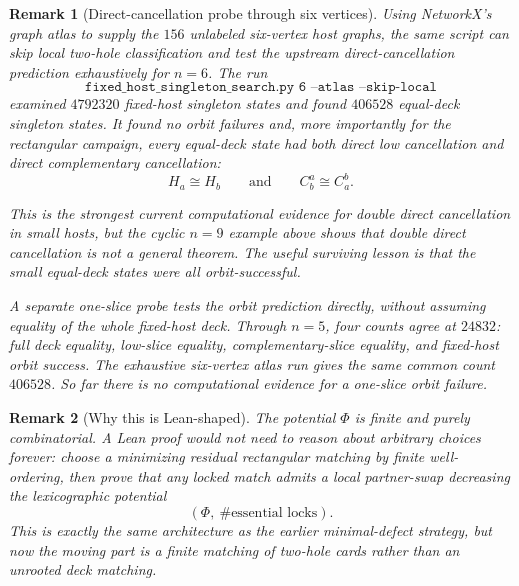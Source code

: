 \documentclass[11pt]{article}
\newtheorem{remark}{Remark}
\begin{document}
\begin{remark}[Direct-cancellation probe through six vertices]
Using NetworkX's graph atlas to supply the \(156\) unlabeled six-vertex host
graphs, the same script can skip local two-hole classification and test the
upstream direct-cancellation prediction exhaustively for \(n=6\).  The run
\[
  \texttt{fixed\_host\_singleton\_search.py 6 --atlas --skip-local}
\]
examined \(4792320\) fixed-host singleton states and found \(406528\)
equal-deck singleton states.  It found no orbit failures and, more
importantly for the rectangular campaign, every equal-deck state had both
direct low cancellation and direct complementary cancellation:
\[
  H_a\cong H_b
  \qquad\text{and}\qquad
  C_b^a\cong C_a^b.
\]

This is the strongest current computational evidence for double direct
cancellation in small hosts, but the cyclic \(n=9\) example above shows that
double direct cancellation is not a general theorem.  The useful surviving
lesson is that the small equal-deck states were all orbit-successful.

A separate one-slice probe tests the orbit prediction directly, without
assuming equality of the whole fixed-host deck.  Through \(n=5\), four counts
agree at \(24832\): full deck equality, low-slice equality, complementary-slice
equality, and fixed-host orbit success.  The exhaustive six-vertex atlas run
gives the same common count \(406528\).  So far there is no computational
evidence for a one-slice orbit failure.
\end{remark}

\begin{remark}[Why this is Lean-shaped]
The potential \(\Phi\) is finite and purely combinatorial.  A Lean proof would
not need to reason about arbitrary choices forever: choose a minimizing
residual rectangular matching by finite well-ordering, then prove that any locked
match admits a local partner-swap decreasing the lexicographic potential
\[
  (\Phi,\ \#\text{essential locks}).
\]
This is exactly the same architecture as the earlier minimal-defect strategy,
but now the moving part is a finite matching of two-hole cards rather than an
unrooted deck matching.
\end{remark}
\end{document}
